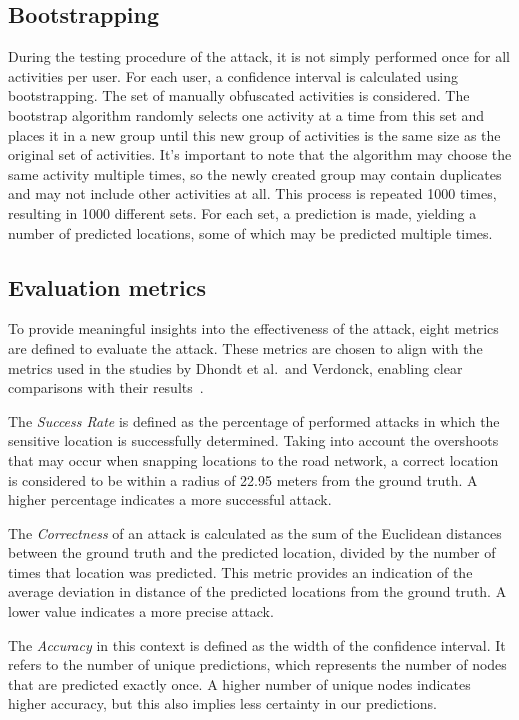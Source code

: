 \documentclass[conference]{IEEEtran}
\begin{document}
\subsection{Bootstrapping}
During the testing procedure of the attack, it is not simply performed once for
all activities per user. For each user, a confidence interval is calculated
using bootstrapping. The set of manually obfuscated activities is considered.
The bootstrap algorithm randomly selects one activity at a time from this set
and places it in a new group until this new group of activities is the same
size as the original set of activities. It's important to note that the
algorithm may choose the same activity multiple times, so the newly created
group may contain duplicates and may not include other activities at all. This
process is repeated 1000 times, resulting in 1000 different sets. For each set,
a prediction is made, yielding a number of predicted locations, some of which
may be predicted multiple times.

\subsection{Evaluation metrics}
To provide meaningful insights into the effectiveness of the attack, eight
metrics are defined to evaluate the attack. These metrics are chosen to align
with the metrics used in the studies by Dhondt et al.\ and Verdonck, enabling
clear comparisons with their results~\cite{Dhondt, Verdonck_2022}.

The \textit{Success Rate} is defined as the percentage of performed attacks in
which the sensitive location is successfully determined. Taking into account
the overshoots that may occur when snapping locations to the road network, a
correct location is considered to be within a radius of 22.95 meters from the
ground truth. A higher percentage indicates a more successful attack.

The \textit{Correctness} of an attack is calculated as the sum of the Euclidean
distances between the ground truth and the predicted location, divided by the
number of times that location was predicted. This metric provides an indication
of the average deviation in distance of the predicted locations from the ground
truth. A lower value indicates a more precise attack.

The \textit{Accuracy} in this context is defined as the width of the confidence
interval. It refers to the number of unique predictions, which represents the
number of nodes that are predicted exactly once. A higher number of unique
nodes indicates higher accuracy, but this also implies less certainty in our
predictions.
\end{document}
